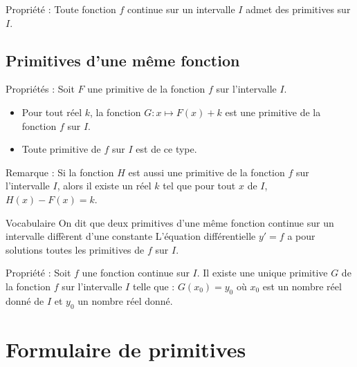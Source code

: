 \documentclass[11pt,a4paper]{article}
\begin{document}
\begin{boiteProp}{Propriété :}
    Toute fonction $f$ continue sur un intervalle $I$ admet des primitives sur $I$.
\end{boiteProp}

\subsection{Primitives d'une même fonction}

\begin{boiteProp}{Propriétés :}
    Soit $F$ une primitive de la fonction $f$ sur l'intervalle $I$.
    \begin{itemize}
        \item Pour tout réel $k$, la fonction $G : x \mapsto F(x) + k$ est une primitive de la fonction $f$ sur $I$.
        \item Toute primitive de $f$ sur $I$ est de ce type.
    \end{itemize}
\end{boiteProp}

\begin{boiteRemarque}{Remarque :}
    Si la fonction $H$ est aussi une primitive de la fonction $f$ sur l'intervalle $I$, alors il existe un réel $k$ tel que pour tout $x$ de $I$, $H(x) - F(x) = k$.
\end{boiteRemarque}

\begin{boiteRemarque}{Vocabulaire}
    On dit que deux primitives d'une même fonction continue sur un intervalle diffèrent d'une constante
    \newline
    L'équation différentielle $y' = f$ a pour solutions toutes les primitives de $f$ sur $I$.    
\end{boiteRemarque}

\begin{boiteProp}{Propriété :}
    Soit $f$ une fonction continue sur $I$.
    \newline
    Il existe une unique primitive $G$ de la fonction $f$ sur l'intervalle $I$ telle que : $G(x_0) = y_0$
    \newline
    où $x_0$ est un nombre réel donné de $I$ et $y_0$ un nombre réel donné.
\end{boiteProp}

\section{Formulaire de primitives}
\end{document}
